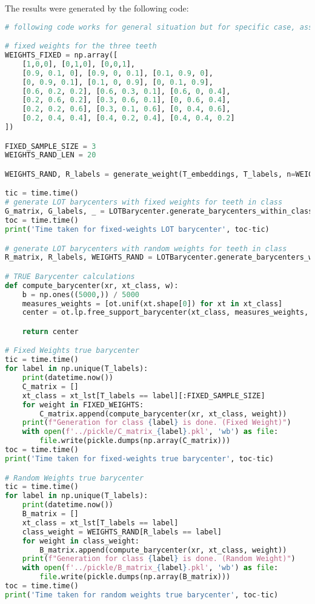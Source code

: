 The results were generated by the following code:
\begin{lstlisting}[language=Python, caption=Code for barycenter generation., label={code:barycenter}]
# following code works for general situation but for specific case, assume that T_embeddings has only 3 samples per class (the ones from the visual)

# fixed weights for the three teeth
WEIGHTS_FIXED = np.array([
    [1,0,0], [0,1,0], [0,0,1], 
    [0.9, 0.1, 0], [0.9, 0, 0.1], [0.1, 0.9, 0], 
    [0, 0.9, 0.1], [0.1, 0, 0.9], [0, 0.1, 0.9],
    [0.6, 0.2, 0.2], [0.6, 0.3, 0.1], [0.6, 0, 0.4], 
    [0.2, 0.6, 0.2], [0.3, 0.6, 0.1], [0, 0.6, 0.4], 
    [0.2, 0.2, 0.6], [0.3, 0.1, 0.6], [0, 0.4, 0.6], 
    [0.2, 0.4, 0.4], [0.4, 0.2, 0.4], [0.4, 0.4, 0.2]
])

FIXED_SAMPLE_SIZE = 3
WEIGHTS_RAND_LEN = 20

WEIGHTS_RAND, R_labels = generate_weight(T_embeddings, T_labels, n=WEIGHTS_RAND_LEN)

tic = time.time()
# generate LOT barycenters with fixed weights for teeth in class
G_matrix, G_labels, _ = LOTBarycenter.generate_barycenters_within_class(T_embeddings, T_labels, WEIGHTS_FIXED, uniform=False, n=WEIGHTS_RAND_LEN)
toc = time.time()
print('Time taken for fixed-weights LOT barycenter', toc-tic)

# generate LOT barycenters with random weights for teeth in class
R_matrix, R_labels, WEIGHTS_RAND = LOTBarycenter.generate_barycenters_within_class(T_embeddings, T_labels, None, uniform=True, n=WEIGHTS_RAND_LEN)

# TRUE Barycenter calculations 
def compute_barycenter(xr, xt_class, w):
    b = np.ones((5000,)) / 5000
    measures_weights = [ot.unif(xt.shape[0]) for xt in xt_class]
    center = ot.lp.free_support_barycenter(xt_class, measures_weights, xr, b, w)

    return center

# Fixed Weights true barycenter
tic = time.time()
for label in np.unique(T_labels):
    print(datetime.now())
    C_matrix = []
    xt_class = xt_lst[T_labels == label][:FIXED_SAMPLE_SIZE]
    for weight in FIXED_WEIGHTS:
        C_matrix.append(compute_barycenter(xr, xt_class, weight))
    print(f"Generation for class {label} is done. (Fixed Weight)")
    with open(f'../pickle/C_matrix_{label}.pkl', 'wb') as file:
        file.write(pickle.dumps(np.array(C_matrix))) 
toc = time.time()
print('Time taken for fixed-weights true barycenter', toc-tic)

# Random Weights true barycenter
tic = time.time()
for label in np.unique(T_labels):
    print(datetime.now())
    B_matrix = []
    xt_class = xt_lst[T_labels == label]
    class_weight = WEIGHTS_RAND[R_labels == label]
    for weight in class_weight:
        B_matrix.append(compute_barycenter(xr, xt_class, weight))
    print(f"Generation for class {label} is done. (Random Weight)")
    with open(f'../pickle/B_matrix_{label}.pkl', 'wb') as file:
        file.write(pickle.dumps(np.array(B_matrix))) 
toc = time.time()
print('Time taken for random weights true barycenter', toc-tic)


\end{lstlisting}
